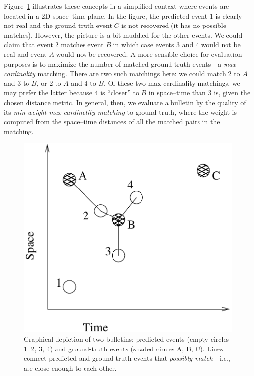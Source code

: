 \documentclass[a4paper,12pt]{article}
\begin{document}
Figure~\ref{fig-2-bulletins} illustrates these concepts in a
simplified context where events are located in a 2D space--time plane.
In the figure, the predicted event $1$ is clearly not real
and the ground truth event $C$ is not recovered (it has no possible
matches). However, the picture is
a bit muddled for the other events. We could claim that event $2$
matches event $B$ in which case events $3$ and $4$ would not be real and
event $A$ would not be recovered. A more sensible choice for
evaluation purposes is to maximize the number of matched ground-truth
events---a {\em max-cardinality} matching. There are two such
matchings here: we could match $2$ to $A$ and $3$ to $B$, or $2$ to
$A$ and $4$ to $B$. Of these two max-cardinality matchings,
we may prefer the latter because $4$ is ``closer'' to $B$ in
space--time than $3$ is, given the chosen distance metric.
In general, then, we evaluate a bulletin by the quality of
its {\em min-weight max-cardinality matching} to ground truth, where
the weight is computed from the space--time distances of all the
matched pairs in the matching.

\begin{figure}
\begin{center}
\includegraphics{fig1.pdf}
\end{center}
\caption{Graphical depiction of two bulletins: predicted events
  (empty circles 1, 2, 3, 4) and ground-truth events (shaded circles
  A, B, C). Lines connect predicted and ground-truth events
  that {\em possibly match}---i.e., are close enough to each other.}
\label{fig-2-bulletins}
\end{figure}
\end{document}
